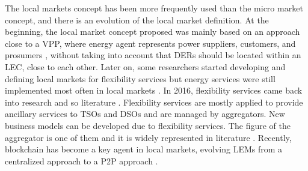 The local markets concept has been more frequently used than the micro market concept, and there is an evolution of the local market definition. At the beginning, the local market concept proposed was mainly based on an approach close to a VPP, where energy agent represents power suppliers, customers, and prosumers \cite{lamparter2010agent, vytelingum2010trading}, without taking into account that DERs should be located within an LEC, close to each other. Later on, some researchers started developing and defining local markets for flexibility services but energy services were still implemented most often in local markets \cite{nguyen2010pool, zhang2014flech, menniti2014local}. In 2016, flexibility services came back into research and
so literature \cite{ramos2016realizing, pavlovic2016sgam}. Flexibility services are mostly applied to provide ancillary services to TSOs and DSOs and are managed by aggregators. New business models can be developed due to flexibility services. The figure of the aggregator is one of them and it is widely represented in literature \cite{rosen2013auction, menniti2014local, EuropeanNetworkofTransmissionSystemOperatorsforElectricityENTSO-E2015, moret2018energy}. Recently, blockchain has become a key agent in local markets, evolving LEMs from a centralized approach to a P2P approach \cite{sousa2018peer, horta2017novel}.

